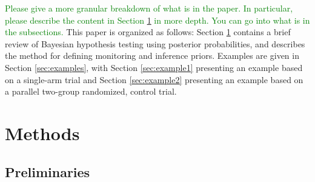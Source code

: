 \documentclass[useAMS,usenatbib,referee]{biom}
\begin{document}
\textcolor{green}{Please give a more granular breakdown of what is in the paper. In particular, please describe the content 
in Section \ref{sec:methods} in more depth. You can go into what is in the subsections.}
This paper is organized as follows: Section \ref{sec:methods} contains a brief review of Bayesian hypothesis testing using posterior probabilities, and describes the method for defining monitoring and inference priors. Examples are given in Section \ref{sec:examples}, with Section \ref{sec:example1} presenting an example based on a single-arm trial and Section \ref{sec:example2} presenting an example based on a parallel two-group randomized, control trial.
\section{Methods}\label{sec:methods}

\subsection{Preliminaries}\label{sec:preliminaries}
\end{document}
